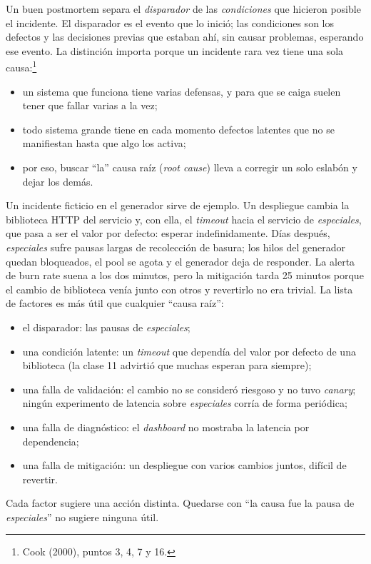 \documentclass[variant=apuntes,cover=institutional,mode=screen]{ua-engineering-v6-article}
\begin{document}
Un buen postmortem separa el \emph{disparador} de las \emph{condiciones} que hicieron posible el incidente. El disparador es el evento que lo inició; las condiciones son los defectos y las decisiones previas que estaban ahí, sin causar problemas, esperando ese evento. La distinción importa porque un incidente rara vez tiene una sola causa:\footnote{Cook (2000), puntos 3, 4, 7 y 16.}
\begin{itemize}
\item un sistema que funciona tiene varias defensas, y para que se caiga suelen tener que fallar varias a la vez;
\item todo sistema grande tiene en cada momento defectos latentes que no se manifiestan hasta que algo los activa;
\item por eso, buscar ``la'' causa raíz (\emph{root cause}) lleva a corregir un solo eslabón y dejar los demás.
\end{itemize}

Un incidente ficticio en el generador sirve de ejemplo. Un despliegue cambia la biblioteca HTTP del servicio y, con ella, el \emph{timeout} hacia el servicio de \emph{especiales}, que pasa a ser el valor por defecto: esperar indefinidamente. Días después, \emph{especiales} sufre pausas largas de recolección de basura; los hilos del generador quedan bloqueados, el pool se agota y el generador deja de responder. La alerta de burn rate suena a los dos minutos, pero la mitigación tarda 25 minutos porque el cambio de biblioteca venía junto con otros y revertirlo no era trivial. La lista de factores es más útil que cualquier ``causa raíz'':
\begin{itemize}
\item el disparador: las pausas de \emph{especiales};
\item una condición latente: un \emph{timeout} que dependía del valor por defecto de una biblioteca (la clase 11 advirtió que muchas esperan para siempre);
\item una falla de validación: el cambio no se consideró riesgoso y no tuvo \emph{canary}; ningún experimento de latencia sobre \emph{especiales} corría de forma periódica;
\item una falla de diagnóstico: el \emph{dashboard} no mostraba la latencia por dependencia;
\item una falla de mitigación: un despliegue con varios cambios juntos, difícil de revertir.
\end{itemize}
Cada factor sugiere una acción distinta. Quedarse con ``la causa fue la pausa de \emph{especiales}'' no sugiere ninguna útil.
\end{document}
